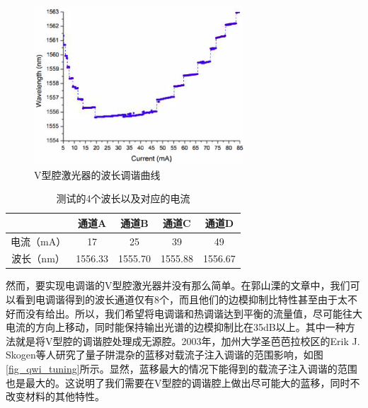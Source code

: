 \documentclass[oneside]{ZJUthesis}
\begin{document}
\begin{figure}[!h]
    \centering
    \includegraphics[width=0.7\textwidth]{./Pictures/GSL_tuning.eps}
    \caption{V型腔激光器的波长调谐曲线}
    \label{fig_gsl_tuning}
\end{figure}

\begin{table}[!t]
    \caption{测试的4个波长以及对应的电流}
    \centering
    \label{tab_4wavelength}
    \begin{tabular}{ccccc}
        \hline
        \hline
         & 通道A & 通道B & 通道C & 通道D\\
        \hline
        电流（mA） & 17 & 25 & 	39 & 49\\
        波长（nm） & 1556.33 & 1555.70 & 1555.88 & 1556.67\\
        \hline
        \hline
    \end{tabular}
\end{table}

然而，要实现电调谐的V型腔激光器并没有那么简单。在郭山溧的文章中，我们可以看到电调谐得到的波长通道仅有8个，而且他们的边模抑制比特性甚至由于太不好而没有给出。所以，我们希望将电调谐和热调谐达到平衡的流量值，尽可能往大电流的方向上移动，同时能保持输出光谱的边模抑制比在35dB以上。其中一种方法就是将V型腔的调谐腔处理成无源腔。2003年，加州大学圣芭芭拉校区的Erik J. Skogen等人研究了量子阱混杂的蓝移对载流子注入调谐的范围影响，如图\ref{fig_qwi_tuning}所示。显然，蓝移最大的情况下能得到的载流子注入调谐的范围也是最大的。这说明了我们需要在V型腔的调谐腔上做出尽可能大的蓝移，同时不改变材料的其他特性。
\end{document}
